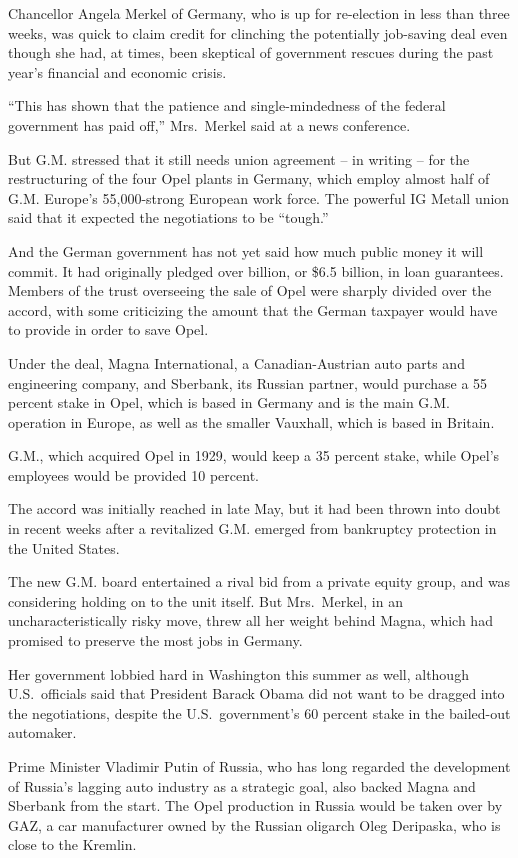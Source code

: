 ﻿\documentclass[12pt]{article}
\begin{document}
Chancellor Angela Merkel of Germany, who is up for re-election in less than three weeks, was quick
to claim credit for clinching the potentially job-saving deal even though she had, at times, been
skeptical of government rescues during the past year's financial and economic crisis.

``This has shown that the patience and single-mindedness of the federal government has paid off,''
Mrs.~Merkel said at a news conference.

But G.M. stressed that it still needs union agreement -- in writing -- for the restructuring of the
four Opel plants in Germany, which employ almost half of G.M. Europe's 55,000-strong European work
force. The powerful IG Metall union said that it expected the negotiations to be ``tough.''

And the German government has not yet said how much public money it will commit. It had originally
pledged over  billion, or \$6.5 billion, in loan guarantees. Members of the trust
overseeing the sale of Opel were sharply divided over the accord, with some criticizing the amount
that the German taxpayer would have to provide in order to save Opel.

Under the deal, Magna International, a Canadian-Austrian auto parts and engineering company, and
Sberbank, its Russian partner, would purchase a 55 percent stake in Opel, which is based in Germany
and is the main G.M. operation in Europe, as well as the smaller Vauxhall, which is based in
Britain.

G.M., which acquired Opel in 1929, would keep a 35 percent stake, while Opel's employees would be
provided 10 percent.

The accord was initially reached in late May, but it had been thrown into doubt in recent weeks
after a revitalized G.M. emerged from bankruptcy protection in the United States.

The new G.M. board entertained a rival bid from a private equity group, and was considering holding
on to the unit itself. But Mrs.~Merkel, in an uncharacteristically risky move, threw all her weight
behind Magna, which had promised to preserve the most jobs in Germany.

Her government lobbied hard in Washington this summer as well, although U.S.~officials said that
President Barack Obama did not want to be dragged into the negotiations, despite the
U.S.~government's 60 percent stake in the bailed-out automaker.

Prime Minister Vladimir Putin of Russia, who has long regarded the development of Russia's lagging
auto industry as a strategic goal, also backed Magna and Sberbank from the start. The Opel
production in Russia would be taken over by GAZ, a car manufacturer owned by the Russian oligarch
Oleg Deripaska, who is close to the Kremlin.
\end{document}
